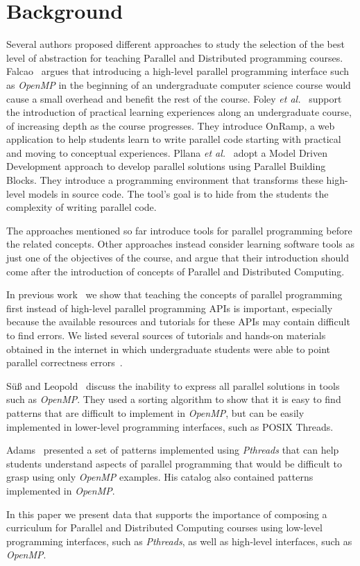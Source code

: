 \section{Background}
\label{sec:background}

Several authors proposed different approaches to study the selection of the best
level of abstraction for teaching Parallel and Distributed programming courses.
Falcao~\cite{6565518} argues that introducing a high-level parallel programming
interface such as \textit{OpenMP} in the beginning of an undergraduate computer
science course would cause a small overhead and benefit the rest of the course.
Foley \textit{et al.}~\cite{FOLEY2017138} support the introduction of practical
learning experiences along an undergraduate course, of increasing depth as the
course progresses. They introduce OnRamp, a web application to help students
learn to write parallel code starting with practical and moving to conceptual
experiences.  Pllana \textit{et al.}~\cite{Pllana:2009} adopt a Model Driven
Development approach to develop parallel solutions using Parallel Building
Blocks. They introduce a programming environment that transforms these
high-level models in source code. The tool's goal is to hide from the students
the complexity of writing parallel code.

The approaches mentioned so far introduce tools for parallel programming before
the related concepts.  Other approaches instead consider learning software
tools as just one of the objectives of the course, and argue that their
introduction should come after the introduction of concepts of Parallel and
Distributed Computing.

In previous work~\cite{goncalves:OpenMPNotEasy} we show that teaching the
concepts of parallel programming first instead of high-level parallel
programming APIs is important, especially because the available resources and
tutorials for these APIs may contain difficult to find errors.  We listed
several sources of tutorials and hands-on materials obtained in the internet in
which undergraduate students were able to point parallel correctness
errors~\cite{SuB:2005:CMO:1892830.1892863}.

Sü\ss{} and Leopold~\cite{Leopold:userOpenMP} discuss the inability to express
all parallel solutions in tools such as \textit{OpenMP}. They used a sorting
algorithm to show that it is easy to find patterns that are difficult to
implement in \textit{OpenMP}, but can be easily implemented in lower-level
programming interfaces, such as POSIX Threads.

Adams~\cite{ADAMS201731} presented a set of patterns implemented using
\textit{Pthreads} that can help students understand aspects of parallel
programming that would be difficult to grasp using only \textit{OpenMP}
examples. His catalog also contained patterns implemented in \textit{OpenMP}.

In this paper we present data that supports the importance of composing a
curriculum for Parallel and Distributed Computing courses using low-level
programming interfaces, such as \textit{Pthreads}, as well as high-level
interfaces, such as \textit{OpenMP}.
